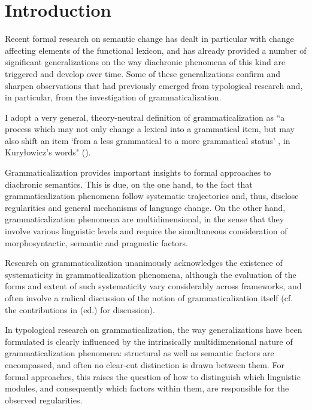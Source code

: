 \documentclass[output=paper,modfonts,nonflat,citecolor=brown,
showindex
]{langsci/langscibook}
\author{Chiara Gianollo\affiliation{Università di Bologna}}
\begin{document}
\maketitle
\section{Introduction}

Recent formal research on semantic change has dealt in particular with change affecting elements of the functional lexicon, and has already provided a number of significant generalizations on the way diachronic phenomena of this kind are triggered and develop over time. Some of these generalizations confirm and sharpen observations that had previously emerged from typological research and, in particular, from the investigation of grammaticalization. 

I adopt a very general, theory-neutral definition of grammaticalization as ``a process which may not only change a lexical into a grammatical item, but may also shift an item `from a less grammatical to a more grammatical status' , in Kury\l{}owicz's words" (\citealt[13]{Lehmann15}).

Grammaticalization provides important insights to formal approaches to diachronic semantics. This is due, on the one hand, to the fact that grammaticalization phenomena follow systematic trajectories and, thus, disclose regularities and general mechanisms of language change. On the other hand, grammaticalization phenomena are multidimensional, in the sense that they involve various linguistic levels and require the simultaneous consideration of morphosyntactic, semantic and pragmatic factors.

Research on grammaticalization unanimously acknowledges the existence of systematicity in grammaticalization phenomena, although the evaluation of the forms and extent of such systematicity vary considerably across frameworks, and often involve a radical discussion of the notion of grammaticalization itself (cf. the contributions in \citealt{Campbell01} (ed.) for discussion).

In typological research on grammaticalization, the way generalizations have been formulated is clearly influenced by the intrinsically multidimensional nature of grammaticalization phenomena: structural as well as semantic factors are encompassed, and often no clear-cut distinction is drawn between them. For formal approaches, this raises the question of how to distinguish which linguistic modules, and consequently which factors within them, are responsible for the observed regularities. 
\end{document}
